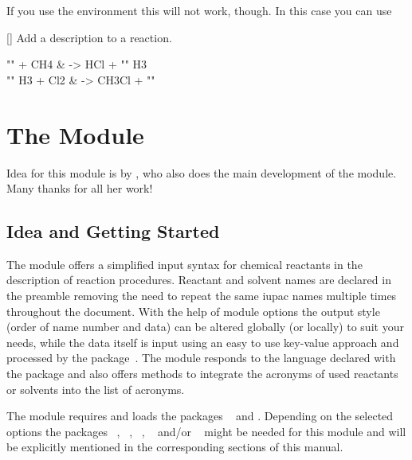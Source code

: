 \documentclass{chemmacros-manual}
\begin{document}
If you use the  environment this will not work, though.  In
this case you can use
\begin{commands}
  []
    Add a description to a reaction.
\end{commands}

\begin{example}
  \begin{reactions}
    "" + CH4  &
      -> HCl + "" H3  \\
    "" H3 + Cl2 &
      -> CH3Cl + "" 
  \end{reactions}
\end{example}

\section{The  Module}\label{sec:reactants-module}
Idea for this module is by \leandriis, who also does the
main development of the module.  Many thanks for all her work!

\subsection{Idea and Getting Started}
The  module offers a simplified input syntax for chemical
reactants in the description of reaction procedures. Reactant and solvent
names are declared in the preamble removing the need to repeat the same
\ac{iupac} names multiple times throughout the document. With the help of
module options the output style (order of name number and data) can be altered
globally (or locally) to suit your needs, while the data itself is input using
an easy to use key-value approach and processed by the 
package~\cite{pkg:siunitx}. The  module responds to the
language declared with the  package and also offers methods to
integrate the acronyms of used reactants or solvents into the list of
acronyms.

The module requires and loads the packages ~\cite{pkg:chemnum}
and . Depending on the selected options the packages
~\cite{pkg:acro},
~\cite{pkg:glossaries-extra},
~\cite{pkg:hyperref}, ~\cite{pkg:longtable}
and/or ~\cite{pkg:xltabular} might be needed for this module
and will be explicitly mentioned in the corresponding sections of this manual.
\end{document}
